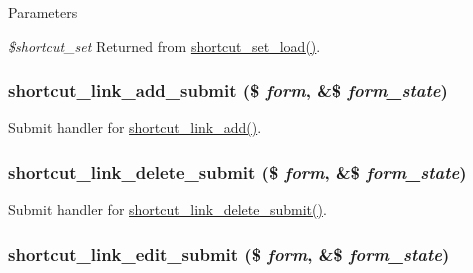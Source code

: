 \begin{DoxyParams}{Parameters}
\item[{\em \$shortcut\_\-set}]Returned from \hyperlink{shortcut_8module_a66161b6ac12978c1a31bb5c5bf27dc65}{shortcut\_\-set\_\-load()}. \end{DoxyParams}
\hypertarget{shortcut_8admin_8inc_a1fca45432bd8b965324d87062eabf5cd}{
\subsubsection[{shortcut\_\-link\_\-add\_\-submit}]{\setlength{\rightskip}{0pt plus 5cm}shortcut\_\-link\_\-add\_\-submit (\$ {\em form}, \/  \&\$ {\em form\_\-state})}}
\label{shortcut_8admin_8inc_a1fca45432bd8b965324d87062eabf5cd}
Submit handler for \hyperlink{group__forms_ga7d6281f92a029c89b4e72756e5f44859}{shortcut\_\-link\_\-add()}. \hypertarget{shortcut_8admin_8inc_a3fd35e609a462a9655b912672be3ed4d}{
\subsubsection[{shortcut\_\-link\_\-delete\_\-submit}]{\setlength{\rightskip}{0pt plus 5cm}shortcut\_\-link\_\-delete\_\-submit (\$ {\em form}, \/  \&\$ {\em form\_\-state})}}
\label{shortcut_8admin_8inc_a3fd35e609a462a9655b912672be3ed4d}
Submit handler for \hyperlink{shortcut_8admin_8inc_a3fd35e609a462a9655b912672be3ed4d}{shortcut\_\-link\_\-delete\_\-submit()}. \hypertarget{shortcut_8admin_8inc_aacf3899caa37c7ba643625cd50bb7022}{
\subsubsection[{shortcut\_\-link\_\-edit\_\-submit}]{\setlength{\rightskip}{0pt plus 5cm}shortcut\_\-link\_\-edit\_\-submit (\$ {\em form}, \/  \&\$ {\em form\_\-state})}}
\label{shortcut_8admin_8inc_aacf3899caa37c7ba643625cd50bb7022}
